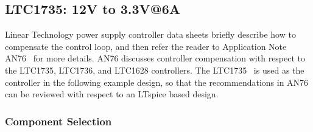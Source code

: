 \subsection{LTC1735: 12V to 3.3V@6A}

Linear Technology power supply controller data sheets briefly
describe how to compensate the control loop, and then refer the
reader to Application Note AN76~\cite{Linear_AN76_1999} for more
details. AN76 discusses controller compensation with respect to 
the LTC1735, LTC1736, and LTC1628 controllers. The 
LTC1735~\cite{Linear_LTC1735_1998} is used as the 
controller in the following example design, so that the
recommendations in AN76 can be reviewed with respect to an
LTspice based design.

\subsubsection{Component Selection}

